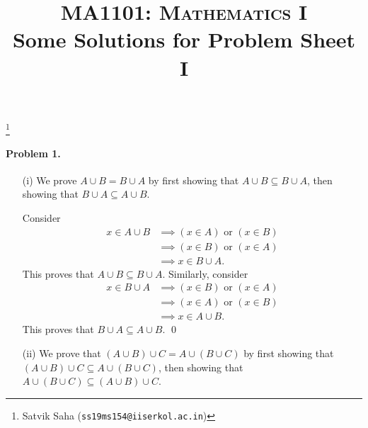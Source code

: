 \documentclass[10pt]{article}
\title{
    \textsc{
        \large
        MA1101: Mathematics I
    }
    \\\vspace{0.2em}
    \textbf{
        \huge
        Some Solutions for Problem Sheet I
    }
    \vspace{-1em}
}
\author{}
\date{}
\renewcommand{\lor}{\text{ or }}
\newcommand\blfootnote[1]{%
    \begingroup
    \renewcommand\thefootnote{}\footnote{#1}%
    \addtocounter{footnote}{-1}%
    \endgroup
}
\begin{document}
    \maketitle
    \blfootnote{
        Satvik Saha (\texttt{ss19ms154@iiserkol.ac.in})
    }

    \paragraph{Problem 1.}
    \begin{enumerate}
        \item[(i)] We prove $A \cup B = B \cup A$ by first showing that $A
        \cup B \subseteq B \cup A$, then showing that $B \cup A \subseteq A
        \cup B$.

        Consider \begin{align*}
            x \in A \cup B
            &\implies (x \in A) \lor (x \in B) \\
            &\implies (x \in B) \lor (x \in A) \\
            &\implies x \in B \cup A.
        \end{align*}
        This proves that $A \cup B \subseteq B \cup A$. Similarly, consider
        \begin{align*}
            x \in B \cup A
            &\implies (x \in B) \lor (x \in A) \\
            &\implies (x \in A) \lor (x \in B) \\
            &\implies x \in A \cup B.
        \end{align*}
        This proves that $B \cup A \subseteq A \cup B$. \qed


        \item[(ii)] We prove that $(A \cup B) \cup C = A \cup (B \cup C)$ by
        first showing that $(A \cup B) \cup C \subseteq A \cup (B \cup C)$,
        then showing that $A \cup (B \cup C) \subseteq (A \cup B) \cup C$.


\end{enumerate}
\end{document}
